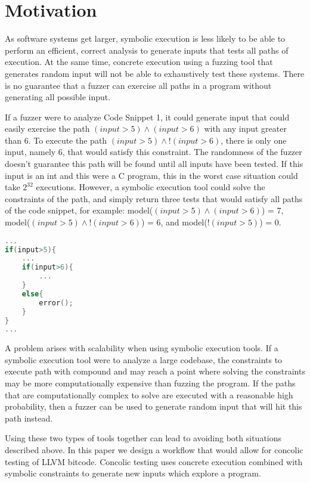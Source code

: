 \section{Motivation}
As software systems get larger, symbolic execution is less likely to be able to perform an efficient, correct analysis to generate inputs that tests all paths of execution.
At the same time, concrete execution using a fuzzing tool that generates random input will not be able to exhaustively test these systems. There is no guarantee that 
a fuzzer can exercise all paths in a program without generating all possible input. 

If a fuzzer were to analyze Code Snippet 1, it could generate input that could easily exercise the path $(input>5)\land (input> 6)$ with any input greater than 6. To execute the
path $(input>5) \land !(input>6)$, there is only one input, namely 6, that would satisfy this constraint. The randomness of the fuzzer doesn't guarantee this path will be found until
all inputs have been tested. If this input is an int and this were a C program, this in the worst case situation could take $2^{32}$ executions. However, a symbolic execution tool could solve the constraints of the path,
and simply return three tests that would satisfy all paths of the code snippet, for example: model($(input>5)\land (input> 6)$) = 7, model($(input>5)\land !(input> 6)$) = 6, and model($!(input>5)$) = 0.
\begin{lstlisting}[caption={Possible Error Code}, language=C, label=snip:motivation]
...
if(input>5){
    ...
    if(input>6){
        ...
    }
    else{
        error();
    }
}
...
\end{lstlisting}

A problem arises with scalability when using symbolic execution tools. If a symbolic execution tool were to analyze a large codebase, the constraints to execute path with compound and may reach a point where solving the constraints may be
more computationally expensive than fuzzing the program. If the paths that are computationally complex to solve are executed with a reasonable high probability,
then a fuzzer can be used to generate random input that will hit this path instead.

Using these two types of tools together can lead to avoiding both situations described above. In this paper we design a workflow that would allow for concolic testing of LLVM bitcode. Concolic testing uses concrete execution combined with symbolic constraints to generate new inputs which explore a program.